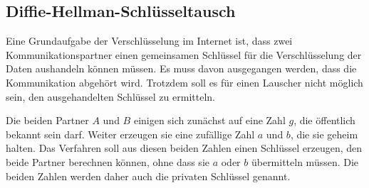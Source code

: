 %


%
%
\subsection{Diffie-Hellman-Schlüsseltausch
\label{buch:subsection:diffie-hellman}}
Eine Grundaufgabe der Verschlüsselung im Internet ist, dass zwei
Kommunikationspartner einen gemeinsamen Schlüssel für die Verschlüsselung
der Daten aushandeln können müssen.
Es muss davon ausgegangen werden, dass die Kommunikation abgehört wird.
Trotzdem soll es für einen Lauscher nicht möglich sein, den 
ausgehandelten Schlüssel zu ermitteln.

Die beiden Partner $A$ und $B$ einigen sich zunächst auf eine Zahl $g$,
die öffentlich bekannt sein darf.
Weiter erzeugen sie eine zufällige Zahl $a$ und $b$, die sie geheim
halten.
Das Verfahren soll aus diesen beiden Zahlen einen Schlüssel erzeugen,
den beide Partner berechnen können, ohne dass sie $a$ oder $b$ 
übermitteln müssen.
Die beiden Zahlen werden daher auch die privaten Schlüssel genannt.

